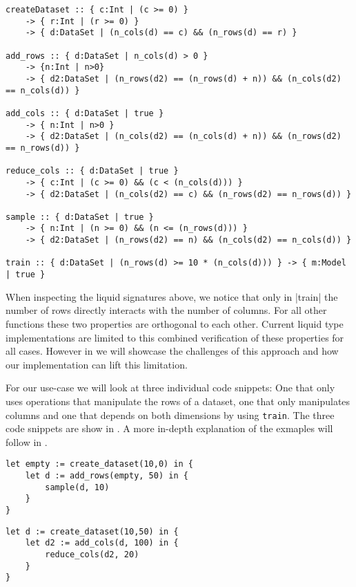 \begin{lstlisting}[numbers=none,tabsize=8,caption={Liquid Signatures of functions in Use-Case 2}]
createDataset :: { c:Int | (c >= 0) }
	-> { r:Int | (r >= 0) }
	-> { d:DataSet | (n_cols(d) == c) && (n_rows(d) == r) }

add_rows :: { d:DataSet | n_cols(d) > 0 }
	-> {n:Int | n>0} 
	-> { d2:DataSet | (n_rows(d2) == (n_rows(d) + n)) && (n_cols(d2) == n_cols(d)) }

add_cols :: { d:DataSet | true } 
	-> { n:Int | n>0 }
	-> { d2:DataSet | (n_cols(d2) == (n_cols(d) + n)) && (n_rows(d2) == n_rows(d)) }

reduce_cols :: { d:DataSet | true } 
	-> { c:Int | (c >= 0) && (c < (n_cols(d))) }
	-> { d2:DataSet | (n_cols(d2) == c) && (n_rows(d2) == n_rows(d)) }

sample :: { d:DataSet | true } 
	-> { n:Int | (n >= 0) && (n <= (n_rows(d))) } 
	-> { d2:DataSet | (n_rows(d2) == n) && (n_cols(d2) == n_cols(d)) }

train :: { d:DataSet | (n_rows(d) >= 10 * (n_cols(d))) } -> { m:Model | true }
\end{lstlisting}

When inspecting the liquid signatures above, we notice that only in |train| the number of rows directly interacts with the number of columns. For all other functions these two properties are orthogonal to each other. Current liquid type implementations are limited to this combined verification of these properties for all cases. However in  we will showcase the challenges of this approach and how our implementation can lift this limitation.

For our use-case we will look at three individual code snippets: One that only uses operations that manipulate the rows of a dataset, one that only manipulates columns and one that depends on both dimensions by using \texttt{train}. The three code snippets are show in . A more in-depth explanation of the exmaples will follow in .

\begin{minipage}{.45\textwidth}
\begin{lstlisting}[caption={Code example that only manipulates rows},label={lst:uc2_code1}]
let empty := create_dataset(10,0) in {
    let d := add_rows(empty, 50) in {
        sample(d, 10)
    }
}
\end{lstlisting}
\end{minipage}\hfill%
\begin{minipage}{.45\textwidth}
\begin{lstlisting}[caption={Code example that only manipulates columns},label={lst:uc2_code2}]
let d := create_dataset(10,50) in {
    let d2 := add_cols(d, 100) in {
        reduce_cols(d2, 20)
    }
}
\end{lstlisting}	
\end{minipage}

